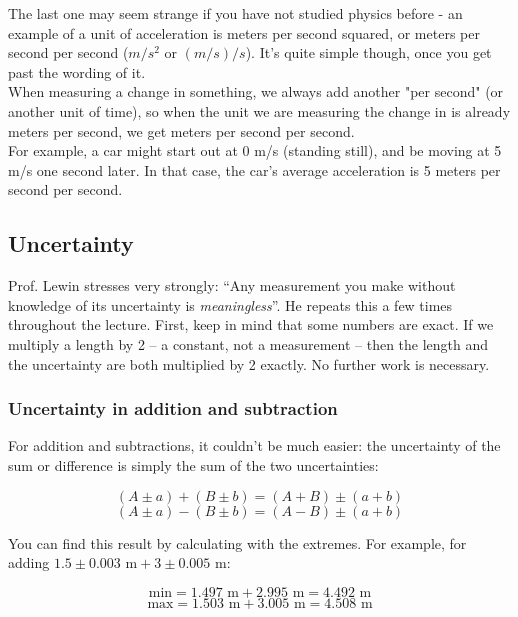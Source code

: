 The last one may seem strange if you have not studied physics before - an example of a unit of acceleration is meters per second squared, or meters per second per second ($m/s^2$ or $(m/s)/s$). It's quite simple though, once you get past the wording of it.\\
When measuring a change in something, we always add another "per second" (or another unit of time), so when the unit we are measuring the change in is already meters per second, we get meters per second per second.\\
For example, a car might start out at 0 m/s (standing still), and be moving at 5 m/s one second later. In that case, the car's average acceleration is 5 meters per second per second.

\subsection{Uncertainty}
Prof. Lewin stresses very strongly: ``Any measurement you make without knowledge of its uncertainty is \emph{meaningless}''. He repeats this a few times throughout the lecture.
First, keep in mind that some numbers are exact. If we multiply a length by 2 -- a constant, not a measurement -- then the length and the uncertainty are both multiplied by 2 exactly. No further work is necessary.\\

\subsubsection{Uncertainty in addition and subtraction}

For addition and subtractions, it couldn't be much easier: the uncertainty of the sum or difference is simply the sum of the two uncertainties:

\begin{equation}
 (A \pm a) + (B \pm b) = (A + B) \pm (a +b)
\end{equation}
\begin{equation}
 (A \pm a) - (B \pm b) = (A - B) \pm (a +b)
\end{equation}

You can find this result by calculating with the extremes. For example, for adding $1.5 \pm 0.003 \text{ m} + 3 \pm 0.005 \text{ m}$:

\begin{equation}
\text{min} = 1.497 \text{ m} + 2.995 \text{ m} = 4.492 \text{ m}
\end{equation}
\begin{equation}
\text{max} = 1.503 \text{ m} + 3.005 \text{ m} = 4.508 \text{ m}
\end{equation}

